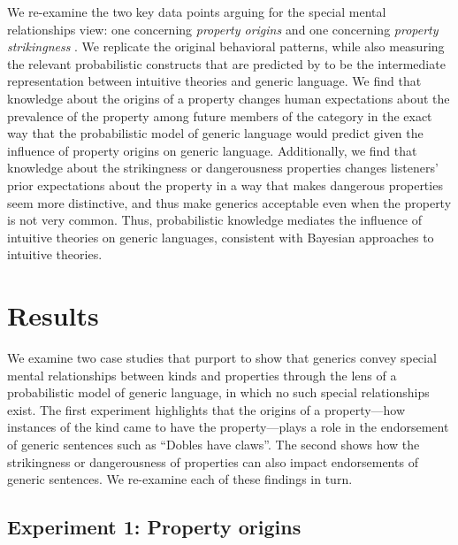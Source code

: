 \documentclass[floatsintext, 11pt, doc]{apa6}
\begin{document}
We re-examine the two key data points arguing for the special mental relationships view: one concerning \emph{property origins} \cite{Gelman2007} and one concerning \emph{property strikingness} \cite{Cimpian2010}.%
We replicate the original behavioral patterns, while also measuring the relevant probabilistic constructs that are predicted by  to be the intermediate representation between intuitive theories and generic language. 
We find that knowledge about the origins of a property changes human expectations about the prevalence of the property among future members of the category in the exact way that the probabilistic model of generic language would predict given the influence of property origins on generic language.
Additionally, we find that knowledge about the strikingness or dangerousness properties changes listeners' prior expectations about the property in a way that makes dangerous properties seem more distinctive, and thus make generics acceptable even when the property is not very common.
Thus, probabilistic knowledge mediates the influence of intuitive theories on generic languages, consistent with Bayesian approaches to intuitive theories. 


\section{Results}

We examine two case studies that purport to show that generics convey special mental relationships between kinds and properties through the lens of a probabilistic model of generic language, in which no such special relationships exist. 
The first experiment highlights that the origins of a property---how instances of the kind came to have the property---plays a role in the endorsement of generic sentences such as ``Dobles have claws''.
The second shows how the strikingness or dangerousness of properties can also impact endorsements of generic sentences.
We re-examine each of these findings in turn. 

\subsection{Experiment 1: Property origins}
\end{document}
